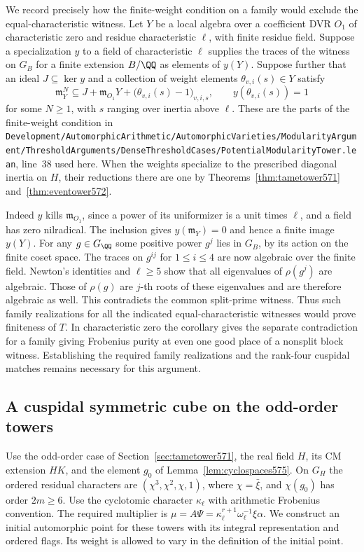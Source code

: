 \documentclass[a4paper,11pt]{article}
\theoremstyle{definition}
\theoremstyle{remark}
\newcommand{\srcloc}[2]{{\small\nolinkurl{#1.lean}}, line~#2}
\numberwithin{equation}{section}
\begin{document}
We record precisely how the finite-weight condition on a
family would exclude the equal-characteristic witness.
Let \(Y\) be a local algebra over a coefficient DVR \(O_1\)
of characteristic zero and residue characteristic \(\ell\),
with finite residue field. Suppose a specialization \(y\)
to a field of characteristic \(\ell\) supplies the traces
of the witness on \(G_B\) for a finite extension \(B/\QQ\)
as elements of \(y(Y)\). Suppose further that an ideal
\(J\subseteq\ker y\) and a collection of weight elements
\(\theta_{v,i}(s)\in Y\) satisfy
\[
   \mathfrak m_Y^N\subseteq
        J+\mathfrak m_{O_1}Y+
                   \bigl(\theta_{v,i}(s)-1\bigr)_{v,i,s},
          \qquad y(\theta_{v,i}(s))=1
\]
for some \(N\ge1\), with \(s\) ranging over inertia above
\(\ell\). These are the parts of the finite-weight condition
in
\srcloc{Development/AutomorphicArithmetic/AutomorphicVarieties/ModularityArgument/ThresholdArguments/DenseThresholdCases/PotentialModularityTower}{38}
used here. When the weights specialize to the prescribed
diagonal inertia on \(H\), their reductions there are one
by Theorems~\ref{thm:tametower571}
and~\ref{thm:eventower572}.

Indeed \(y\) kills \(\mathfrak m_{O_1}\), since a power
of its uniformizer is a unit times \(\ell\), and a field
has zero nilradical. The inclusion gives \(y(\mathfrak m_Y)=0\)
and hence a finite image \(y(Y)\). For any \(g\in G_\QQ\)
some positive power \(g^j\) lies in \(G_B\), by its action
on the finite coset space. The traces on \(g^{ij}\) for
\(1\le i\le4\) are now algebraic over the finite field.
Newton's identities and \(\ell\ge5\) show that all
eigenvalues of \(\rho(g^j)\) are algebraic. Those of
\(\rho(g)\) are \(j\)-th roots of these eigenvalues and
are therefore algebraic as well. This contradicts the
common split-prime witness. Thus such family realizations
for all the indicated equal-characteristic witnesses would
prove finiteness of \(T\). In characteristic zero the
corollary gives the separate contradiction for a family
giving Frobenius purity at even one good place of a
nonsplit block witness. Establishing the required family
realizations and the rank-four cuspidal matches remains
necessary for this argument.


\subsection{A cuspidal symmetric cube on the odd-order towers}
\label{sec:cubicseed577}

Use the odd-order case of Section~\ref{sec:tametower571}, the
real field \(H\), its CM extension \(HK\), and the element
\(g_0\) of Lemma~\ref{lem:cyclospaces575}. On \(G_H\) the
ordered residual characters are \((\chi^3,\chi^2,\chi,1)\),
where \(\chi=\bar\xi\), and \(\chi(g_0)\) has order \(2m\ge6\).
Use the cyclotomic character \(\kappa_\ell\) with arithmetic
Frobenius convention. The required multiplier is
\(\mu=A\Psi=\kappa_\ell^{r+1}\omega_\ell^{-1}\xi\alpha\).
We construct an initial automorphic point for these towers
with its integral representation and ordered flags. Its weight
is allowed to vary in the definition of the initial point.
\end{document}
